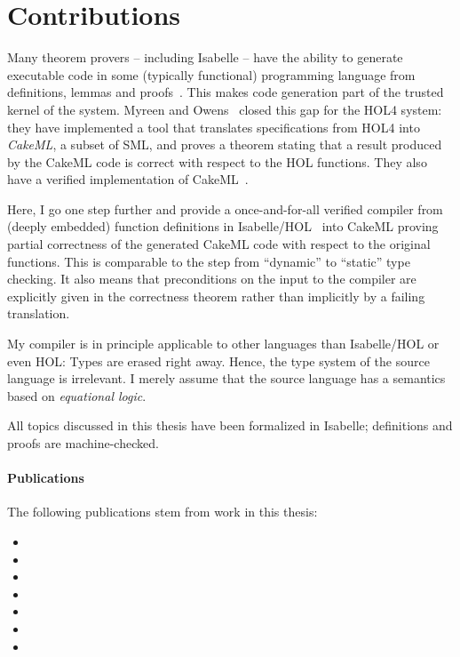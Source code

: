 
\section{Contributions}
\label{sec:intro:contrib}

Many theorem provers -- including Isabelle -- have the ability to generate executable code in some (typically functional) programming language from definitions, lemmas and
proofs~\cite{BerghoferN-TYPES00,Letouzey02,BoespflugDG11,Shankar01,PVS-attachments,GreveKMMRRSVW08,BoyerM02}.
This makes code generation part of the trusted kernel of the system.
Myreen and Owens~\cite{myreen2014translation} closed this gap for the HOL4 system: they have implemented a tool that translates specifications from HOL4 into \emph{CakeML}, a subset of SML, and proves a theorem stating that a result produced by the CakeML code is correct with respect to the HOL functions.
They also have a verified implementation of CakeML~\cite{kumar2014cakeml,tan2016cakeml}.

Here, I go one step further and provide a once-and-for-all verified compiler from (deeply embedded) function definitions in Isabelle/HOL~\cite{nipkow2014semantics} into CakeML proving partial correctness of the generated CakeML code with respect to the original functions.
This is comparable to the step from ``dynamic'' to ``static'' type checking.
It also means that preconditions on the input to the compiler are explicitly given in the correctness theorem rather than implicitly by a failing translation.

My compiler is in principle applicable to other languages than Isabelle/HOL or even HOL:
Types are erased right away.
Hence, the type system of the source language is irrelevant.
I merely assume that the source language has a semantics based on \emph{equational logic}.

All topics discussed in this thesis have been formalized in Isabelle; definitions and proofs are machine-checked.

\paragraph{Publications}
The following publications stem from work in this thesis:

\begin{itemize}[label=\faFileTextO]
  \item {}
  \item {}
  \item {}
  \item {}
  \item {}
  \item {}
  \item {}
\end{itemize}